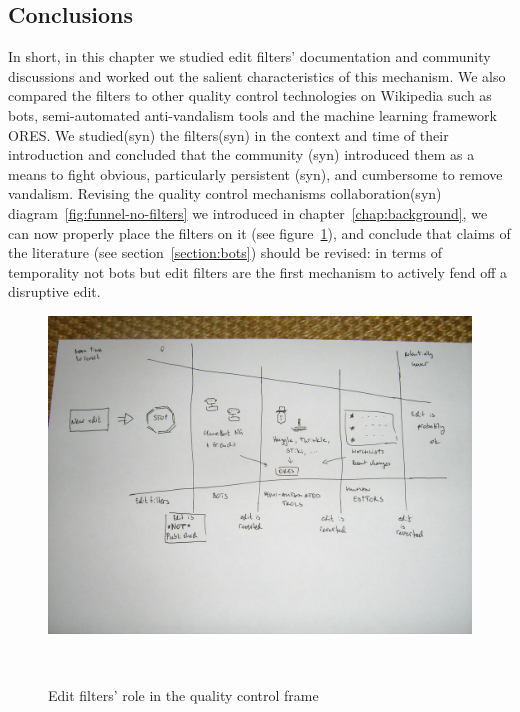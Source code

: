\subsection{Conclusions}

In short, in this chapter we studied edit filters' documentation and community discussions and worked out the salient characteristics of this mechanism.
We also compared the filters to other quality control technologies on Wikipedia such as bots, semi-automated anti-vandalism tools and the machine learning framework ORES.
We studied(syn) the filters(syn) in the context and time of their introduction and concluded that the community (syn) introduced them as a means to fight obvious, particularly persistent (syn), and cumbersome to remove vandalism.
Revising the quality control mechanisms collaboration(syn) diagram~\ref{fig:funnel-no-filters} we introduced in chapter~\ref{chap:background}, we can now properly place the filters on it (see figure~\ref{fig:funnel-with-filters}),
and conclude that claims of the literature (see section~\ref{section:bots}) should be revised: in terms of temporality not bots but edit filters are the first mechanism to actively fend off a disruptive edit.

\begin{figure}
\centering
  \includegraphics[width=0.9\columnwidth]{pics/funnel-diagramm-with-filters.JPG}
  \caption{Edit filters' role in the quality control frame}~\label{fig:funnel-with-filters}
\end{figure}
